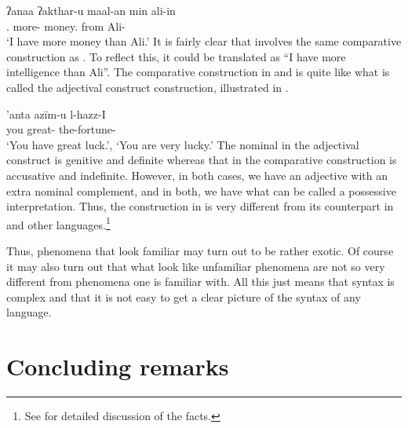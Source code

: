 \documentclass[output=paper]{langsci/langscibook}
\begin{document}
\ea\label{ex:key:4.35}
    \sn\gll ʔanaa        ʔakthar-u    maal-an      min    ali-in\\
            \Fsg.\M{} more-\Nom{} money.\Acc{} from Ali-\Gen{}\\
    \glt    \enquote*{I have more money than Ali.}
\z
%
It is fairly clear that  involves the same comparative
construction as . To reflect this, it could be translated as
\enquote{I have more intelligence than Ali}. The comparative construction in
 and  is quite like what is called the
adjectival construct construction, illustrated in .

\ea\label{ex:key:4.36}
    \sn\gll ’anta    azīm-u        l-hazz-I\\
            you    great-\Nom{}    the-fortune-\Gen{}\\
    \glt    \enquote*{You have great luck.}, \enquote*{You are very lucky.}
\z
%
The nominal in the adjectival construct is genitive and definite whereas that
in the comparative construction is accusative and indefinite. However, in both
cases, we have an adjective with an extra nominal complement, and in both, we
have what can be called a possessive interpretation. Thus, the construction in
 is very different from its counterpart in  and
other languages.\footnote{See \citet{AlsArnBor2017} for detailed discussion of
the facts.}

Thus, phenomena that look familiar may turn out to be rather exotic. Of course
it may also turn out that what look like unfamiliar phenomena are not so very
different from phenomena one is familiar with. All this just means that syntax
is complex and that it is not easy to get a clear picture of the syntax of any
language.

\section{Concluding remarks}\label{sec-5:conclusions}
\end{document}
